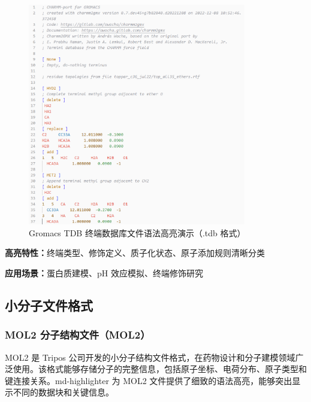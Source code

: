 \begin{figure}[!h]
    \centering
    \includegraphics[width=0.85\textwidth]{../images/tdb.png}
    \caption{Gromacs TDB 终端数据库文件语法高亮演示（.tdb 格式）}
    \label{fig:tdb-highlighting}
\end{figure}

\textbf{高亮特性：}终端类型、修饰定义、质子化状态、原子添加规则清晰分类

\textbf{应用场景：}蛋白质建模、pH 效应模拟、终端修饰研究

\subsection{小分子文件格式}

\subsubsection{MOL2 分子结构文件（MOL2）}

MOL2 是 Tripos 公司开发的小分子结构文件格式，在药物设计和分子建模领域广泛使用。该格式能够存储分子的完整信息，包括原子坐标、电荷分布、原子类型和键连接关系。md-highlighter 为 MOL2 文件提供了细致的语法高亮，能够突出显示不同的数据块和关键信息。


